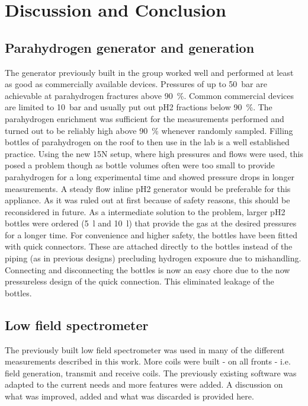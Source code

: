 \chapter{Discussion and Conclusion}
    \label{chap:conclusion}
    \section{Parahydrogen generator and generation}
        The generator previously built in the group worked well and performed at least as good as commercially available devices. Pressures of up to \SI{50}{\bar} are achievable at parahydrogen fractures above \SI{90}{\%}. Common commercial devices are limited to \SI{10}{\bar} and usually put out pH2 fractions below \SI{90}{\%}. The parahydrogen enrichment was sufficient for the measurements performed and turned out to be reliably high above \SI{90}{\%} whenever randomly sampled.
        Filling bottles of parahydrogen on the roof to then use in the lab is a well established practice. Using the new 15N setup, where high pressures and flows were used, this posed a problem though as bottle volumes often were too small to provide parahydrogen for a long experimental time and showed pressure drops in longer measurements. A steady flow inline pH2 generator would be preferable for this appliance. As it was ruled out at first because of safety reasons, this should be reconsidered in future. As a intermediate solution to the problem, larger pH2 bottles were ordered (\SI{5}{\l} and \SI{10}{\l}) that provide the gas at the desired pressures for a longer time. For convenience and higher safety, the bottles have been fitted with quick connectors. These are attached directly to the bottles instead of the piping (as in previous designs) precluding hydrogen exposure due to mishandling. Connecting and disconnecting the bottles is now an easy chore due to the now pressureless design of the quick connection. This eliminated leakage of the bottles.
    \section{Low field spectrometer}
        The previously built low field spectrometer was used in many of the different measurements described in this work. More coils were built - on all fronts - i.e. field generation, transmit and receive coils. The previously existing software was adapted to the current needs and more features were added. A discussion on what was improved, added and  what was discarded is provided here.
